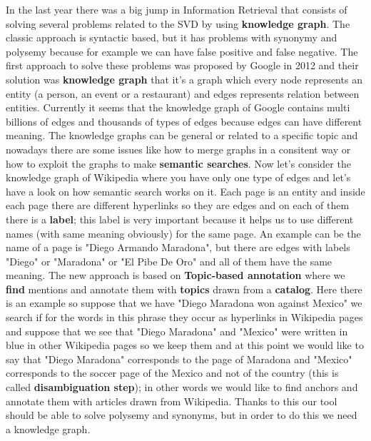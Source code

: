 In the last year there was a big jump in Information Retrieval that consists of solving several problems related to the SVD by using \textbf{knowledge graph}.\newline
The classic approach is syntactic based, but it has problems with synonymy and polysemy because for example we can have false positive and false negative. The first approach to solve these problems was proposed by Google in 2012 and their solution was \textbf{knowledge graph} that it's a graph which every node represents an entity (a person, an event or a restaurant) and edges represents relation between entities. Currently it seems that the knowledge graph of Google contains multi billions of edges and thousands of types of edges because edges can have different meaning.\newline 
The knowledge graphs can be general or related to a specific topic and nowadays there are some issues like how to merge graphs in a consitent way or how to exploit the graphs to make \textbf{semantic searches}.\newline
Now let's consider the knowledge graph of Wikipedia where you have only one type of edges and let's have a look on how semantic search works on it. Each page is an entity and inside each page there are different hyperlinks so they are edges and on each of them there is a \textbf{label}; this label is very important because it helps us to use different names (with same meaning obviously) for the same page. An example can be the name of a page is "Diego Armando Maradona", but there are edges with labels "Diego" or "Maradona" or "El Pibe De Oro" and all of them have the same meaning.\newline
The new approach is based on \textbf{Topic-based annotation} where we \textbf{find} mentions and annotate them with \textbf{topics} drawn from a \textbf{catalog}. Here there is an example so suppose that we have "Diego Maradona won against Mexico" we search if for the words in this phrase they occur as hyperlinks in Wikipedia pages and suppose that we see that "Diego Maradona" and "Mexico" were written in blue in other Wikipedia pages so we keep them and at this point we would like to say that "Diego Maradona" corresponds to the page of Maradona and "Mexico" corresponds to the soccer page of the Mexico and not of the country (this is called \textbf{disambiguation step}); in other words we would like to find anchors and annotate them with articles drawn from Wikipedia. Thanks to this our tool should be able to solve polysemy and synonyms, but in order to do this we need a knowledge graph.\newline
